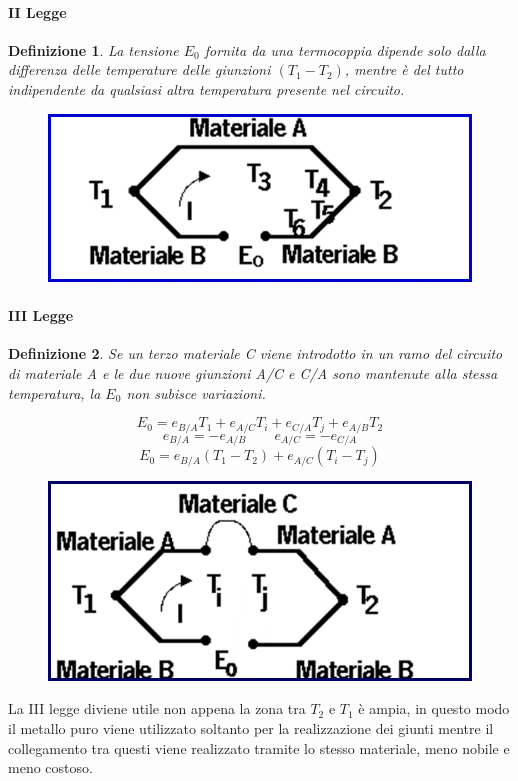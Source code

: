 \documentclass[a4paper, 15pt]{article}
\newtheorem*{definizione}{Definizione}
\begin{document}
\paragraph{II Legge} 		
\begin{definizione}		
	La tensione $E_0$ fornita da una termocoppia dipende solo dalla differenza delle
	temperature delle giunzioni $(T_1-T_2)$, mentre è del tutto indipendente da
	qualsiasi altra temperatura presente nel circuito.
\end{definizione}	

	\begin{figure}[H]
		\centering
		\includegraphics[width=0.5\linewidth]{immagini/screenshot021}
		\label{fig:screenshot021}
	\end{figure}
	
\paragraph{III Legge} 		
\begin{definizione}		
	Se un terzo materiale C viene introdotto in un ramo del circuito di materiale A
	e le due nuove giunzioni A/C e C/A sono mantenute alla stessa temperatura,
	la $E_0$ non subisce variazioni.
\end{definizione}		
	\[E_0 = e_{B/A}T_1 + e_{A/C}T_i + e_{C/A}T_j + e_{A/B}T_2\]
	\[e_{B/A} = - e_{A/B} \qquad e_{A/C} = - e_{C/A}\]
	\[E_0 =  e_{B/A}(T_1-T_2) + e_{A/C}(T_i-T_j)\]
	\begin{figure}[H]
		\centering
		\includegraphics[width=0.5\linewidth]{immagini/screenshot022}
		\label{fig:screenshot022}
	\end{figure}
	La III legge diviene utile non appena la zona tra $T_2$ e $T_1$ è ampia, in questo modo il metallo puro viene utilizzato soltanto per la realizzazione dei giunti mentre il collegamento tra questi viene realizzato tramite lo stesso materiale, meno nobile e meno costoso.  
\newpage	
\end{document}
